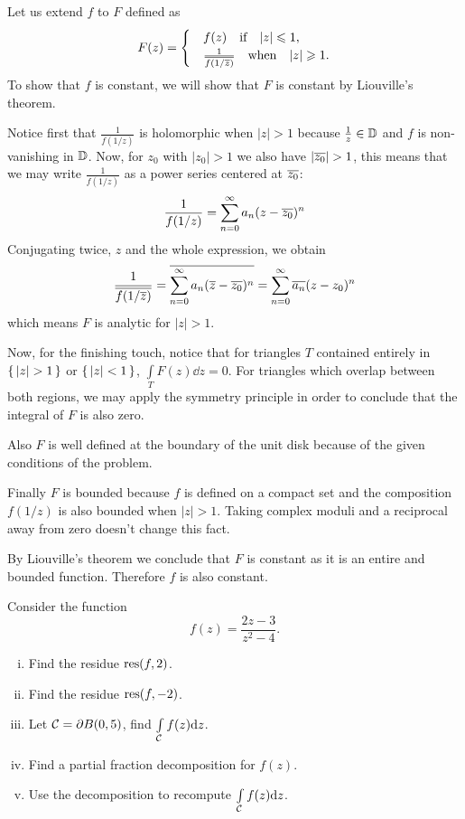 \documentclass[12pt]{memoir}
\begin{document}
\begin{ptcbr}
Let us extend $f$ to $F$ defined as 
$$F(z)=\begin{cases}
    &f(z)\quad\text{if}\quad|z|\leqslant 1,\\
    &\frac{1}{\overline{f(1/\overline z)}}\quad\text{when}\quad|z|\geqslant 1.
\end{cases}$$
To show that $f$ is constant, we will show that $F$ is constant by Liouville's theorem.\par 
Notice first that $\frac{1}{f(1/z)}$ is holomorphic when $|z|>1$ because $\frac{1}{z}\in\mathbb{D}$ and $f$ is non-vanishing in $\mathbb{D}$. Now, for $z_0$ with $|z_0|>1$ we also have $|\ov{z_0}|>1$, this means that we may write $\frac{1}{f(1/z)}$ as a power series centered at $\overline{z_0}$:
$$\frac{1}{f(1/z)}=\sum_{n=0}^{\infty
}a_n(z-\overline{z_0})^n$$
Conjugating twice, $z$ and the whole expression, we obtain 
$$\frac{1}{\overline{f(1/\overline{z})}}=\overline{\sum_{n=0}^{\infty
}a_n(\overline{z}-\overline{z_0})^n}=\sum_{n=0}^{\infty}\overline{a_n}(z-z_0)^n$$
which means $F$ is analytic for $|z|>1$.\par 
Now, for the finishing touch, notice that for triangles $T$ contained entirely in $\set{|z|>1}$ or $\{\,|z|<1\,\}$, $\int\limits_TF(z)\dd z=0$. For triangles which overlap between both regions, we may apply the symmetry principle in order to conclude that the integral of $F$ is also zero.\par 
Also $F$ is well defined at the boundary of the unit disk because of the given conditions of the problem.\par
Finally $F$ is bounded because $f$ is defined on a compact set and the composition $f(1/z)$ is also bounded when $|z|>1$. Taking complex moduli and a reciprocal away from zero doesn't change this fact.\par 
By Liouville's theorem we conclude that $F$ is constant as it is an entire and bounded function. Therefore $f$ is also constant.
\end{ptcbr}

\begin{Ej}
    Consider the function 
    $$f(z)=\frac{2z-3}{z^2-4}.$$
    \begin{enumerate}[i)]
        \itemsep=-0.4em
        \item Find the residue $\operatorname*{res}(f,2)$.
        \item Find the residue $\operatorname*{res}(f,-2)$.
        \item Let $\mathcal{C}=\partial B(0,5)$, find $\int\limits_{\mathcal{C}} f(z)\dd z$. 
        \item Find a partial fraction decomposition for $f(z)$.
        \item Use the decomposition to recompute $\int\limits_{\mathcal{C}} f(z)\dd z$.
    \end{enumerate}
\end{Ej}
\end{document}
